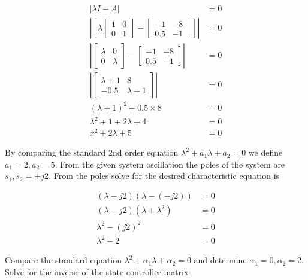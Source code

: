 \documentclass[main.tex]{subfiles}
\begin{document}
\begin{enumerate}
\begin{enumerate}
        $$
        \begin{aligned}
        |\lambda I-A| &= 0 \\
        \left|\left[\lambda\left[\begin{array}{ll}
        1 & 0 \\
        0 & 1
        \end{array}\right]-\left[\begin{array}{cc}
        -1 & -8 \\
        0.5 & -1
        \end{array}\right]\right]\right| &=0 \\
        \left|\left[\begin{array}{ll}
        \lambda & 0 \\
        0 & \lambda
        \end{array}\right]-\left[\begin{array}{cc}
        -1 & -8 \\
        0.5 & -1
        \end{array}\right]\right| &=0 \\
        \left|\left[\begin{array}{ll}
        \lambda+1 & 8 \\
        -0.5 & \lambda+1
        \end{array}\right]\right| &= 0 \\
        (\lambda+1)^2+0.5 \times 8  &= 0 \\
        \lambda^2+1+2 \lambda+4 &= 0 \\
        x^2+2 \lambda+5 &= 0
        \end{aligned}
        $$

        By comparing the standard 2nd order equation $\lambda^2+a_1 \lambda+a_2=0$ we define $a_1=2, a_2=5$. From the given system oscillation the poles of the system are $s_1, s_2= \pm j 2$. From the poles solve for the desired characteristic equation is 

        $$
        \begin{aligned}
        (\lambda-j 2)(\lambda-(-j 2)) &= 0 \\
        (\lambda-j 2)\left(\lambda+\lambda^2\right) &= 0 \\
        \lambda^2-(j 2)^2 &= 0 \\
        \lambda^2+2 &= 0
        \end{aligned}
        $$

        Compare the standard equation $\lambda^2+\alpha_1 \lambda+\alpha_2=0$ and determine $\alpha_1=0, \alpha_2=2$. Solve for the inverse of the state controller matrix


\end{enumerate}
\end{enumerate}
\end{document}
